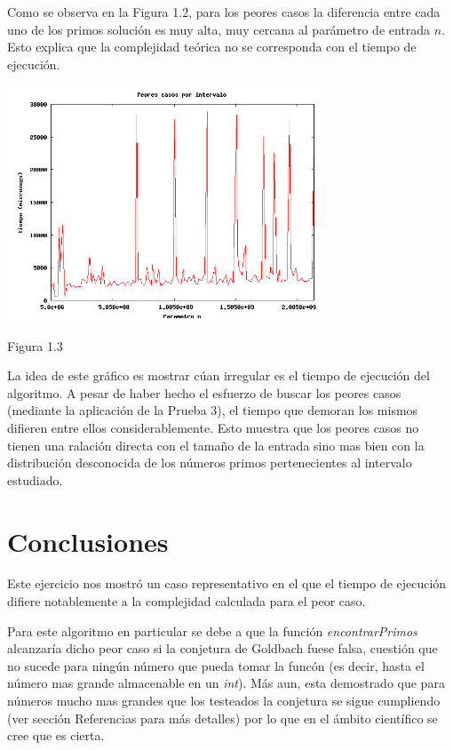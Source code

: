 \documentclass[a4paper,10pt] {article}
\begin{document}
Como se observa en la Figura 1.2, para los peores casos la diferencia entre cada uno de los primos soluci\'on es muy alta, muy cercana al par\'ametro de entrada $n$. Esto explica que la complejidad te\'orica no se corresponda con el tiempo de ejecuci\'on.

\begin{center}
 \includegraphics[width=0.7\textwidth]{Plots/Ej1-PeoresCasos.png}
\begin{center}
Figura 1.3
\end{center}
\end{center}

La idea de este gr\'afico es mostrar c\'uan irregular es el tiempo de ejecuci\'on del algoritmo. A pesar de haber hecho el esfuerzo de buscar los peores casos (mediante la aplicaci\'on de la Prueba 3), el tiempo que demoran los mismos difieren entre ellos considerablemente. Esto muestra que los peores casos no tienen una ralaci\'on directa con el tama\~{n}o de la entrada sino mas bien con la distribuci\'on desconocida de los n\'umeros primos pertenecientes al intervalo estudiado.


\section*{Conclusiones}

Este ejercicio nos mostr\'o un caso representativo en el que el tiempo de ejecuci\'on difiere notablemente a la complejidad calculada para el peor caso.

Para este algoritmo en particular se debe a que la funci\'on \textit{encontrarPrimos} alcanzar\'ia dicho peor caso si la conjetura de Goldbach fuese falsa, cuesti\'on que no sucede para ning\'un n\'umero que pueda tomar la func\'on (es decir, hasta el n\'umero mas grande almacenable en un \textit{int}). M\'as aun, esta demostrado que para n\'umeros mucho mas grandes que los testeados la conjetura se sigue cumpliendo (ver secci\'on Referencias para m\'as detalles) por lo que en el \'ambito cient\'ifico se cree que es cierta.
\end{document}
